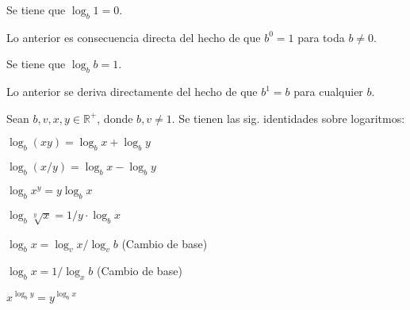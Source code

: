 \begin{prop}
    Se tiene que $\log_{b}1=0$.
\end{prop}

Lo anterior es consecuencia directa del hecho de que $b^0=1$ 
para toda $b\neq 0$.

\begin{prop}
    Se tiene que $\log_{b}b=1$.
\end{prop}

Lo anterior se deriva directamente del hecho de que
$b^1=b$ para cualquier $b$.

\begin{thm}
    Sean $b,v,x,y\in\mathbb{R^{+}}$, donde $b,v\neq 1$. Se tienen las sig.
    identidades sobre logaritmos:
    \begin{enumerate}
    \begin{multicols}{2}
        \item $\log_{b}\left(x y\right)=\log_{b}x+\log_{b}y$
        \item $\log_{b}\left(x/y\right)=\log_{b}x-\log_{b}y$
        \item $\log_{b}x^{y}=y\log_{b}x$
        \item $\log_{b}\sqrt[y]{x}=1/y\cdot\log_{b}x$
        \item $\log_{b}x=\log_{v}x/\log_{v}b$ (Cambio de base)
        \item $\log_{b}x=1/\log_{x}b$ (Cambio de base)
        \item $x^{\log_{b}y}=y^{\log_{b}x}$
    \end{multicols}
    \end{enumerate}
\end{thm}

